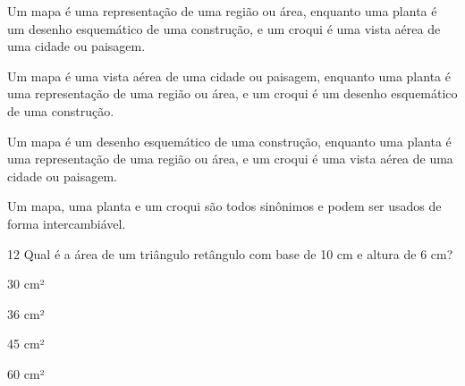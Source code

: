\begin{escolha}
\item Um mapa é uma representação de uma região ou área, enquanto uma planta é um desenho esquemático de uma construção, e um croqui é uma vista aérea de uma cidade ou paisagem.
\item Um mapa é uma vista aérea de uma cidade ou paisagem, enquanto uma planta é uma representação de uma região ou área, e um croqui é um desenho esquemático de uma construção.
\item Um mapa é um desenho esquemático de uma construção, enquanto uma planta é uma representação de uma região ou área, e um croqui é uma vista aérea de uma cidade ou paisagem.
\item Um mapa, uma planta e um croqui são todos sinônimos e podem ser usados de forma intercambiável.
\end{escolha}




\num{12} Qual é a área de um triângulo retângulo com base de 10 cm e altura
de 6 cm?

\begin{escolha}
\item 30 cm²
\item 36 cm²
\item 45 cm²
\item 60 cm²
\end{escolha}





